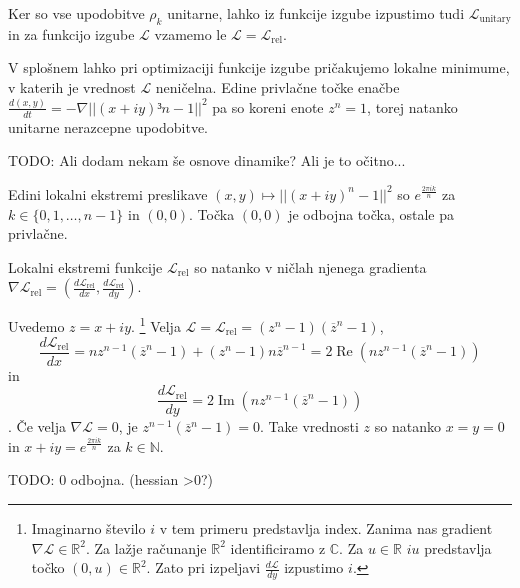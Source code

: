 \documentclass[mat2, tisk]{fmfdelo}
\newcommand{\TODO}[1]{{\color{blue} TODO: #1}}
\newcommand{\R}{\mathbb R}
\newcommand{\N}{\mathbb N}
\newcommand{\loss }{\mathcal L}
\newcommand{\Loss}[1]{\mathcal L _\text{#1}}
\newcommand{\C}{\mathbb C}
\begin{document}
    Ker so vse upodobitve $\rho_k$ unitarne, lahko iz funkcije izgube izpustimo tudi $\Loss{unitary}$ in za funkcijo izgube $\loss$ vzamemo le $\loss=\Loss{rel}$.

    V splošnem lahko pri optimizaciji funkcije izgube pričakujemo lokalne minimume, v katerih je vrednost $\loss$ neničelna. Edine privlačne točke enačbe $\frac{d(x,y)}{dt} = -\nabla ||(x + iy)³n -1||^2$ pa so koreni enote $z^n=1$, torej natanko unitarne nerazcepne upodobitve.  

    \TODO{Ali dodam nekam še osnove dinamike? Ali je to očitno...}
    
    \begin{izrek}
    Edini lokalni ekstremi preslikave $(x,y) \mapsto ||(x + iy)^n -1||^2$ so $e^\frac{2 \pi i k}{n}$  za $k \in \{0,1, \dotsc, n-1\}$ in $(0,0)$. Točka $(0,0)$ je odbojna točka, ostale pa privlačne. 
    \end{izrek}
    \begin{dokaz}
        Lokalni ekstremi funkcije $\Loss{rel}$ so natanko v ničlah njenega gradienta $\nabla \Loss{rel} = (\frac{d\Loss{rel}}{dx}, \frac{d\Loss{rel}}{dy})$. 

        Uvedemo $z = x + iy$.
        \footnote{Imaginarno število $i$ v tem primeru predstavlja index.
        Zanima nas gradient $\nabla \loss \in \R^2$. Za lažje računanje $\R^2$ identificiramo z $\C$. 
        Za $u   \in \R$  $iu$ predstavlja točko $(0, u) \in \R^2$. Zato pri izpeljavi $\frac{d\loss}{dy}$ izpustimo $i$.}
        Velja $\loss = \Loss{rel} = (z^n-1)(\overline{z}^n-1)$,
        $$\frac{d\Loss{rel}}{dx} = nz^{n-1}(\overline{z}^n -1) + (z^n -1) n \overline{z}^{n-1} = 2 \operatorname{Re}(n z^{n-1}(\overline{z}^n -1))
        $$
        in 
        $$\frac{d\Loss{rel}}{dy} = 
        2\operatorname{Im}(n z^{n-1}(\overline{z}^n -1))
        $$. 
            Če velja $\nabla \loss = 0$, je $z^{n-1}(\overline{z} ^n -1) = 0$. Take vrednosti $z$ so natanko $x=y=0$ in $x + iy = e^\frac{2 \pi i k}{n}$ za $k \in \N$.

            \TODO{$0$ odbojna. (hessian >0?)}
    \end{dokaz}
\end{document}
